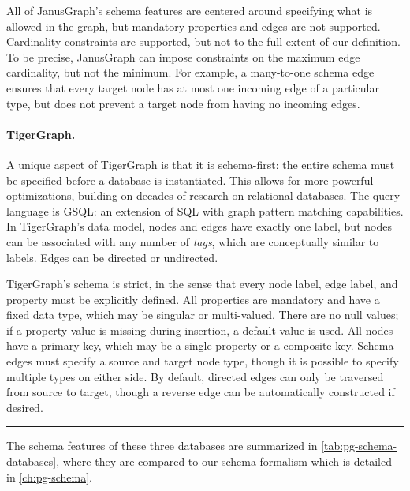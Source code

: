 \documentclass{report}
\theoremstyle{definition}
\newcommand{\sep}{\begin{center}\color{muted}\rule{0.33333\textwidth}{0.4pt}\vspace{4pt}\end{center}}
\begin{document}
All of JanusGraph's schema features are centered around specifying what is allowed in the graph, but mandatory properties and edges are not supported. Cardinality constraints are supported, but not to the full extent of our definition. To be precise, JanusGraph can impose constraints on the maximum edge cardinality, but not the minimum. For example, a many-to-one schema edge ensures that every target node has at most one incoming edge of a particular type, but does not prevent a target node from having no incoming edges.

\paragraph{TigerGraph.} A unique aspect of TigerGraph \citep{deutsch2019tigergraph} is that it is schema-first: the entire schema must be specified before a database is instantiated. This allows for more powerful optimizations, building on decades of research on relational databases. The query language is GSQL: an extension of SQL with graph pattern matching capabilities. In TigerGraph's data model, nodes and edges have exactly one label, but nodes can be associated with any number of \emph{tags}, which are conceptually similar to labels. Edges can be directed or undirected.

TigerGraph's schema is strict, in the sense that every node label, edge label, and property must be explicitly defined. All properties are mandatory and have a fixed data type, which may be singular or multi-valued. There are no null values; if a property value is missing during insertion, a default value is used. All nodes have a primary key, which may be a single property or a composite key. Schema edges must specify a source and target node type, though it is possible to specify multiple types on either side. By default, directed edges can only be traversed from source to target, though a reverse edge can be automatically constructed if desired.

\sep

The schema features of these three databases are summarized in \autoref{tab:pg-schema-databases}, where they are compared to our schema formalism which is detailed in \autoref{ch:pg-schema}.
\end{document}
